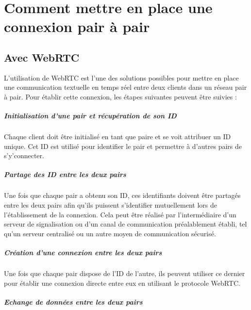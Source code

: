 \chapter{Comment mettre en place une connexion pair à pair}

\section{Avec WebRTC}

L'utilisation de WebRTC est l'une des solutions possibles pour mettre en place une communication textuelle en temps réel entre deux clients dans un réseau pair à pair.
Pour établir cette connexion, les étapes suivantes peuvent être suivies :

\paragraph{Initialisation d'une pair et récupération de son ID}

Chaque client doit être initialisé en tant que paire et se voit attribuer un ID unique. Cet ID est utilisé pour identifier le pair et permettre à d'autres pairs de s'y'connecter.

\paragraph{Partage des ID entre les deux pairs}

Une fois que chaque pair a obtenu son ID, ces identifiants doivent être partagés entre les deux pairs afin qu'ils puissent s'identifier mutuellement lors de l'établissement de la connexion. 
Cela peut être réalisé par l'intermédiaire d'un serveur de signalisation ou d'un canal de communication préalablement établi, tel qu'un serveur centralisé ou un autre moyen de communication sécurisé.

\paragraph{Création d'une connexion entre les deux pairs}

Une fois que chaque pair dispose de l'ID de l'autre, ils peuvent utiliser ce dernier pour établir une connexion directe entre eux en utilisant le protocole WebRTC.

\paragraph{Echange de données entre les deux pairs}

